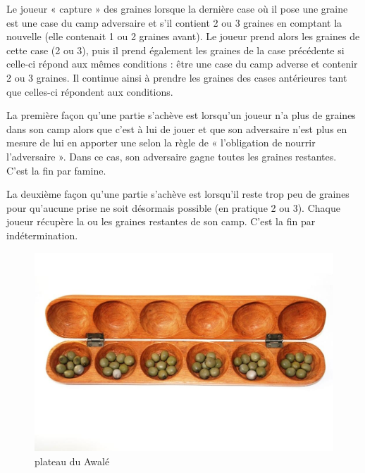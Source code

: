 \begin{itemize}
    Le joueur « capture » des graines lorsque la dernière case où il pose une graine est une case du camp adversaire et s'il contient 2 ou 3 
    graines en comptant la nouvelle (elle contenait 1 ou 2 graines avant). Le joueur prend alors les graines de cette case (2 ou 3), puis il 
    prend également les graines de la case précédente si celle-ci répond aux mêmes conditions : être une case du camp adverse et contenir 2 ou 3 graines. 
    Il continue ainsi à prendre les graines des cases antérieures tant que celles-ci répondent aux conditions.

    La première façon qu'une partie s'achève est lorsqu’un joueur n’a plus de graines dans son camp alors que c’est à lui de jouer et que son adversaire n’est plus en mesure 
    de lui en apporter une selon la règle de « l’obligation de nourrir l’adversaire ». Dans ce cas, son adversaire gagne toutes les graines restantes. C’est 
    la fin par famine.

    La deuxième façon qu'une partie s'achève est lorsqu’il reste trop peu de graines pour qu’aucune prise ne soit désormais possible (en pratique 2 ou 3). 
    Chaque joueur récupère la ou les graines restantes de son camp. C’est la fin par indétermination.
    
    \begin{figure}[!htb]
        \begin{center}
            \includegraphics[scale=0.5]{root/awale_en_bois}
        \end{center}
        \caption{plateau du Awalé}\label{fig:awale_en_bois}
    \end{figure}

\end{itemize}

